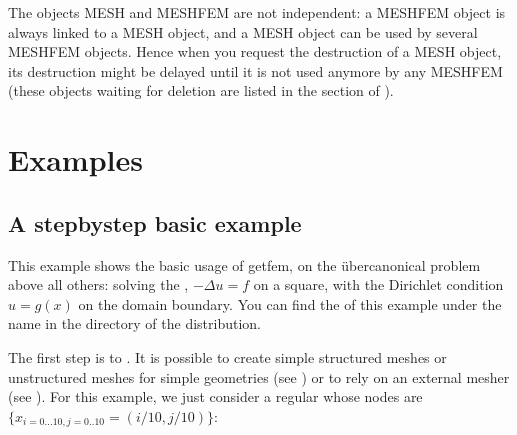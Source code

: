 \documentclass[a4paper,11pt,english]{sphinxmanual}
\begin{document}
\sphinxAtStartPar
The objects MESH and MESHFEM are not independent: a MESHFEM object is always
linked to a MESH object, and a MESH object can be used by several MESHFEM
objects. Hence when you request the destruction of a MESH object, its destruction
might be delayed until it is not used anymore by any MESHFEM (these objects
waiting for deletion are listed in the  section of
).


\chapter{Examples}
\label{\detokenize{matlab_octave/examples:examples}}\label{\detokenize{matlab_octave/examples:mlab-examples}}\label{\detokenize{matlab_octave/examples::doc}}

\section{A step\sphinxhyphen{}by\sphinxhyphen{}step basic example}
\label{\detokenize{matlab_octave/examples:a-step-by-step-basic-example}}\label{\detokenize{matlab_octave/examples:mlab-laplacianexample}}
\sphinxAtStartPar
This example shows the basic usage of getfem, on the über\sphinxhyphen{}canonical problem above
all others: solving the , \(-\Delta u = f\) on a square,
with the Dirichlet condition \(u = g(x)\) on the domain boundary. You can find
the  of this example under the name  in the
directory  of the  distribution.

\sphinxAtStartPar
The first step is to . It is possible to create simple structured meshes or unstructured meshes for simple geometries (see ) or to rely on an external mesher (see ).  For this example, we
just consider a regular  whose nodes are
\(\{x_{i=0\ldots10,j=0..10}=(i/10,j/10)\}\):
\end{document}
